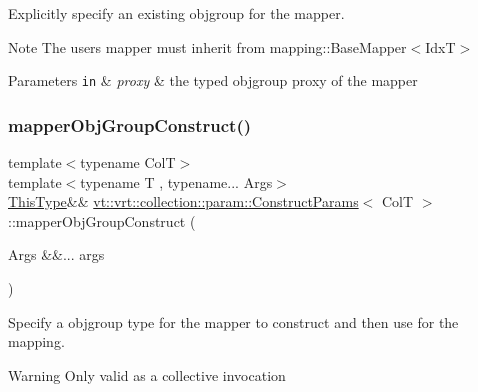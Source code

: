Explicitly specify an existing objgroup for the mapper. 

\begin{DoxyNote}{Note}
The user\textquotesingle{}s mapper must inherit from {\ttfamily mapping\+::\+Base\+Mapper$<$\+Idx\+T$>$} 
\end{DoxyNote}

\begin{DoxyParams}[1]{Parameters}
\mbox{\tt in}  & {\em proxy} & the typed objgroup proxy of the mapper \\
\hline
\end{DoxyParams}
\mbox{\label{structvt_1_1vrt_1_1collection_1_1param_1_1_construct_params_aee38f6542fd11f8b10f1eab73c590807}} 
\subsubsection{\texorpdfstring{mapper\+Obj\+Group\+Construct()}{mapperObjGroupConstruct()}}
{\footnotesize\ttfamily template$<$typename ColT$>$ \\
template$<$typename T , typename... Args$>$ \\
\hyperlink{structvt_1_1vrt_1_1collection_1_1param_1_1_construct_params_a13d4910c0f6825c7b0ddfebce5288bea}{This\+Type}\&\& \hyperlink{structvt_1_1vrt_1_1collection_1_1param_1_1_construct_params}{vt\+::vrt\+::collection\+::param\+::\+Construct\+Params}$<$ ColT $>$\+::mapper\+Obj\+Group\+Construct (\begin{DoxyParamCaption}\item[{Args \&\&...}]{args }\end{DoxyParamCaption})\hspace{0.3cm}{\ttfamily [inline]}}



Specify a objgroup type for the mapper to construct and then use for the mapping. 

\begin{DoxyWarning}{Warning}
Only valid as a collective invocation 
\end{DoxyWarning}
\mbox{\label{structvt_1_1vrt_1_1collection_1_1param_1_1_construct_params_ae84568f9ea86b3b5a5aa86eca8962db0}} 
